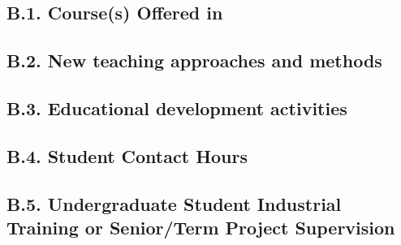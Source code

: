 \documentclass[10pt]{article}
\begin{document}

\subsection*{B.1. Course(s) Offered in \the\year}




\subsection*{B.2. New teaching approaches and methods}



\subsection*{B.3. Educational development activities}



\subsection*{B.4. Student Contact Hours}



\subsection*{B.5. Undergraduate Student Industrial Training or Senior/Term Project Supervision}

\end{document}
